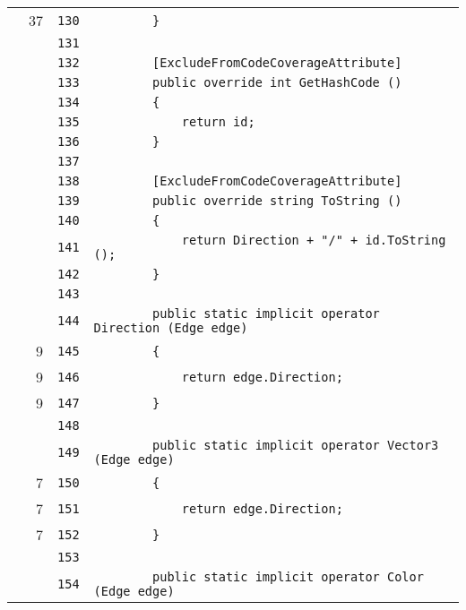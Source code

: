\documentclass[a4paper,10pt]{article}
\begin{document}
\begin{longtable}[l]{lrrl}
\cellcolor{green} & 37 & \verb~130~ & \verb~        }~\\
\cellcolor{gray} &  & \verb~131~ & \verb~~\\
\cellcolor{gray} &  & \verb~132~ & \verb~        [ExcludeFromCodeCoverageAttribute]~\\
\cellcolor{gray} &  & \verb~133~ & \verb~        public override int GetHashCode ()~\\
\cellcolor{gray} &  & \verb~134~ & \verb~        {~\\
\cellcolor{gray} &  & \verb~135~ & \verb~            return id;~\\
\cellcolor{gray} &  & \verb~136~ & \verb~        }~\\
\cellcolor{gray} &  & \verb~137~ & \verb~~\\
\cellcolor{gray} &  & \verb~138~ & \verb~        [ExcludeFromCodeCoverageAttribute]~\\
\cellcolor{gray} &  & \verb~139~ & \verb~        public override string ToString ()~\\
\cellcolor{gray} &  & \verb~140~ & \verb~        {~\\
\cellcolor{gray} &  & \verb~141~ & \verb~            return Direction + "/" + id.ToString ();~\\
\cellcolor{gray} &  & \verb~142~ & \verb~        }~\\
\cellcolor{gray} &  & \verb~143~ & \verb~~\\
\cellcolor{gray} &  & \verb~144~ & \verb~        public static implicit operator Direction (Edge edge)~\\
\cellcolor{green} & 9 & \verb~145~ & \verb~        {~\\
\cellcolor{green} & 9 & \verb~146~ & \verb~            return edge.Direction;~\\
\cellcolor{green} & 9 & \verb~147~ & \verb~        }~\\
\cellcolor{gray} &  & \verb~148~ & \verb~~\\
\cellcolor{gray} &  & \verb~149~ & \verb~        public static implicit operator Vector3 (Edge edge)~\\
\cellcolor{green} & 7 & \verb~150~ & \verb~        {~\\
\cellcolor{green} & 7 & \verb~151~ & \verb~            return edge.Direction;~\\
\cellcolor{green} & 7 & \verb~152~ & \verb~        }~\\
\cellcolor{gray} &  & \verb~153~ & \verb~~\\
\cellcolor{gray} &  & \verb~154~ & \verb~        public static implicit operator Color (Edge edge)~\\

\end{longtable}
\end{document}
